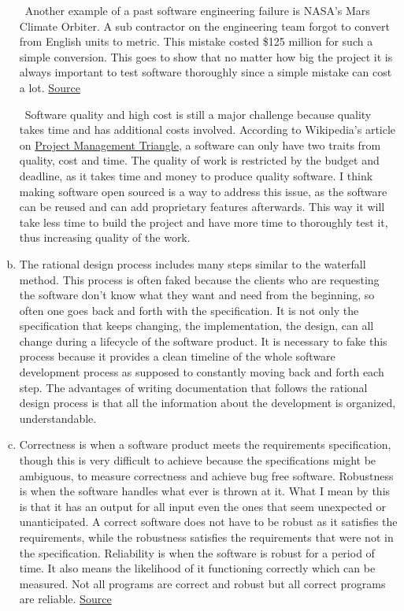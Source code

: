 \documentclass[12pt]{article}
\begin{document}
\begin{enumerate}[(a)]
~\newline\noindent Another example of a past software engineering failure is NASA's Mars Climate Orbiter. A sub contractor on the engineering team forgot to convert from English units to metric. This mistake costed \$125 million for such a simple conversion. This goes to show that no matter how big the project it is always important to test software thoroughly since a simple mistake can cost a lot. \href{https://raygun.com/blog/costly-software-errors-history}{Source}

~\newline\noindent Software quality and high cost is still a major challenge because quality takes time and has additional costs involved. According to Wikipedia's article on \href{https://en.wikipedia.org/wiki/Project_management_triangle}{Project Management Triangle}, a software can only have two traits from quality, cost and time. The quality of work is restricted by the budget and deadline, as it takes time and money to produce quality software. I think making software open sourced is a way to address this issue, as the software can be reused and can add proprietary features afterwards. This way it will take less time to build the project and have more time to thoroughly test it, thus increasing quality of the work.

\item The rational design process includes many steps similar to the waterfall method. This process is often faked because the clients who are requesting the software don't know what they want and need from the beginning, so often one goes back and forth with the specification. It is not only the specification that keeps changing, the implementation, the design, can all change during a lifecycle of the software product.  It is necessary to fake this process because it provides a clean timeline of the whole software development process as supposed to constantly moving back and forth each step. The advantages of writing documentation that follows the rational design process is that all the information about the development is organized, understandable.

\item Correctness is when a software product meets the requirements specification, though this is very difficult to achieve because the specifications might be ambiguous, to measure correctness and achieve bug free software. Robustness is when the software handles what ever is thrown at it. What I mean by this is that it has an output for all input even the ones that seem unexpected or unanticipated. A correct software does not have to be robust as it satisfies the requirements, while the robustness satisfies the requirements that were not in the specification. Reliability is when the software is robust for a period of time. It also means the likelihood of it functioning correctly which can be measured. Not all programs are correct and robust but all correct programs are reliable. \href{https://gitlab.cas.mcmaster.ca/smiths/se2aa4_cs2me3/blob/master/Lectures/L03_SoftwareQuality/SoftwareQuality.pdf}{Source} 


\end{enumerate}
\end{document}
